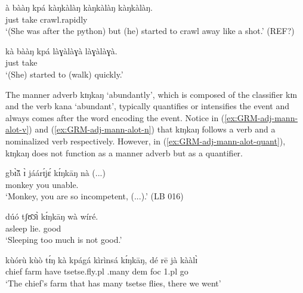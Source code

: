 \begin{exe}
\begin{exe}
\begin{exe}


\ea\label{ex:GRM-adj-mann-ideo-adv}


\ea\label{ex:GRM-adj-mann-ideo}
\gll à bààŋ kpá {kàŋkàlàŋ kàŋkàlàŋ kàŋkàlàŋ}.\\
{\conn} just take crawl.rapidly\\
\glt `(She was after the python) but (he) started to crawl away like a shot.' 
(REF?)

\ex\label{ex:GRM-adj-mann-adv}
\gll  kà bààŋ kpá làɣàlàɣà làɣàlàɣà.\\
{\conn} just take {\advm} {\advm}\\
\glt `(She) started to (walk) quickly.'


\z 
 \z


The manner adverb {\sls kɪŋkaŋ} `abundantly',  which is composed of the 
classifier
{\sls kɪn} and the verb {\sls kana} `abundant',  typically quantifies or 
intensifies
the
event and always comes after the word encoding the event.  Notice in
(\ref{ex:GRM-adj-mann-alot-v})  and (\ref{ex:GRM-adj-mann-alot-n})   that {\sls 
kɪŋkaŋ} follows a verb and a nominalized verb respectively. However, in
(\ref{ex:GRM-adj-mann-alot-quant}), {\sls kɪŋkaŋ} does not function as a
manner adverb but as a quantifier.



\ea\label{ex:GRM-adj-mann-alot}

\ea\label{ex:GRM-adj-mann-alot-v}
\gll gbɪ̃̀ã́     ɪ̀    jáárɪ́jɛ́  kɪ́ŋkāŋ    nà
(...)\\ 
monkey   you  unable.{\pfv}  {\advm} {\foc} {}\\
\glt `Monkey, you are so incompetent, (...).' (LB 016)

\ex\label{ex:GRM-adj-mann-alot-n}

\gll dúó tʃʊ̄ɔ̄ɪ̀ kɪ́ŋkāŋ wà wíré.\\
asleep lie.{\nmlz} {\advm} {\neg} good\\
\glt `Sleeping too much is not good.'

\ex\label{ex:GRM-adj-mann-alot-quant}
\gll kùórù   kùò tɪ́ŋ   kà   kpágá kìrìnsá  kɪ́ŋkāŋ, dé rē jà 
kààlɪ̀\\
 chief farm {\art} {\rel} have tsetse.fly.{\sc pl}  {\quant}.many {\sc dem} {\sc 
foc} {\sc 1.pl} go\\
\glt   `The chief's farm that has  many tsetse flies, there we went' 


\z 
 \z




\end{exe}
\end{exe}
\end{exe}
